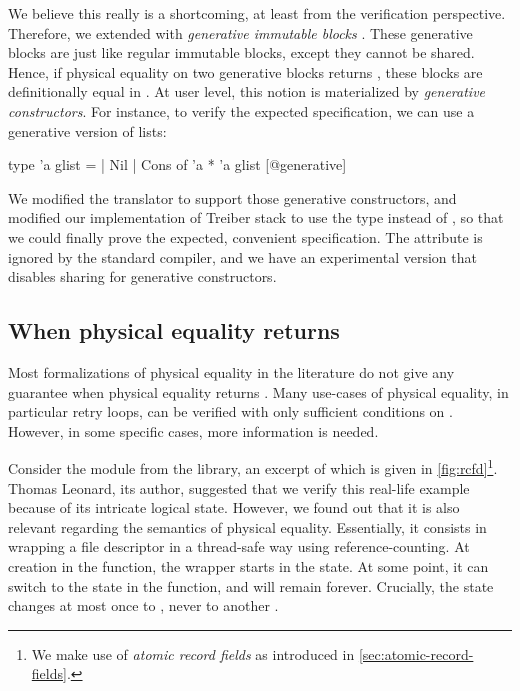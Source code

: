 \label{subsec:generative-constructors}
We believe this really is a shortcoming, at least from the verification perspective.
Therefore, we extended \OCaml with \emph{generative immutable blocks}
.
These generative blocks are just like regular immutable blocks, except they cannot be shared.
Hence, if physical equality on two generative blocks returns , these blocks are definitionally equal in \Rocq.
At user level, this notion is materialized by \emph{generative constructors}.
For instance, to verify the expected  specification, we can use a generative version of lists:

\begin{ocamlcode}
type 'a glist =
  | Nil
  | Cons of 'a * 'a glist [@generative]
\end{ocamlcode}

We modified the \Zoo translator to support those generative constructors, and modified our implementation of Treiber stack to use the type  instead of , so that we could finally prove the expected, convenient specification. The \ocamlinline{[@generative]} attribute is ignored by the standard \OCaml compiler, and we have an experimental version that disables sharing for generative constructors.

\subsection{When physical equality returns }



Most formalizations of physical equality in the literature do not give any guarantee when physical equality returns .
Many use-cases of physical equality, in particular retry loops, can be verified with only sufficient conditions on .
However, in some specific cases, more information is needed.

Consider the  module from the \Eio library, an excerpt of which is given in \cref{fig:rcfd}\footnote{We make use of \emph{atomic record fields} as introduced in \cref{sec:atomic-record-fields}.}.
Thomas Leonard, its author, suggested that we verify this real-life example because of its intricate logical state.
However, we found out that it is also relevant regarding the semantics of physical equality.
Essentially, it consists in wrapping a file descriptor in a thread-safe way using reference-counting.
At creation in the  function, the wrapper starts in the  state.
At some point, it can switch to the  state in the  function, and will remain  forever.
Crucially, the  state changes at most once to , never to another .

